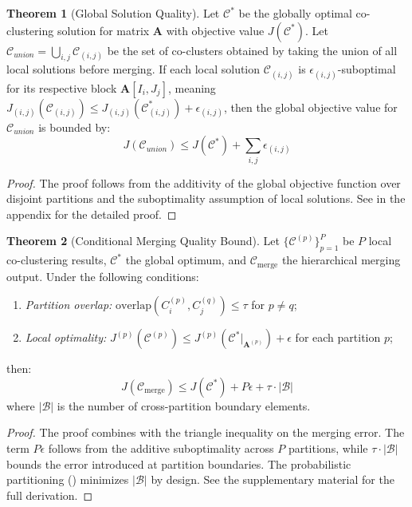 \documentclass[journal]{IEEEtran}
\theoremstyle{definition}
\newtheorem{theorem}{Theorem}
\theoremstyle{remark} %
\begin{document}
{\begin{theorem}[Global Solution Quality]
    \label{thm:global-solution-quality}
    Let $\mathcal{C}^*$ be the globally optimal co-clustering solution for matrix $\mathbf{A}$ with objective value $J(\mathcal{C}^*)$. Let $\mathcal{C}_{union} = \bigcup_{i,j} \mathcal{C}_{(i,j)}$ be the set of co-clusters obtained by taking the union of all local solutions before merging. If each local solution $\mathcal{C}_{(i,j)}$ is $\epsilon_{(i,j)}$-suboptimal for its respective block $\mathbf{A}[I_i, J_j]$, meaning $J_{(i,j)}(\mathcal{C}_{(i,j)}) \le J_{(i,j)}(\mathcal{C}_{(i,j)}^*) + \epsilon_{(i,j)}$, then the global objective value for $\mathcal{C}_{union}$ is bounded by:
    \begin{equation}
        J(\mathcal{C}_{union}) \le J(\mathcal{C}^*) + \sum_{i,j} \epsilon_{(i,j)}
    \end{equation}
\end{theorem}
\begin{proof}
    The proof follows from the additivity of the global objective function over disjoint partitions and the suboptimality assumption of local solutions. See  in the appendix for the detailed proof.
\end{proof}
{\color{blue}
\begin{theorem}[Conditional Merging Quality Bound]\label{thm:merging-quality}
    Let $\{\mathcal{C}^{(p)}\}_{p=1}^{P}$ be $P$ local co-clustering results,
    $\mathcal{C}^*$ the global optimum, and $\mathcal{C}_{\mathrm{merge}}$ the hierarchical
    merging output. Under the following conditions:
    \begin{enumerate}
        \item \emph{Partition overlap:} $\mathrm{overlap}(C_i^{(p)}, C_j^{(q)}) \leq \tau$
              for $p \neq q$;
        \item \emph{Local optimality:} $J^{(p)}(\mathcal{C}^{(p)}) \leq
                  J^{(p)}(\mathcal{C}^*|_{\mathbf{A}^{(p)}}) + \epsilon$ for each partition $p$;
    \end{enumerate}
    then:
    \begin{equation}
        J(\mathcal{C}_{\mathrm{merge}}) \leq J(\mathcal{C}^*) + P\epsilon
        + \tau \cdot |\mathcal{B}|
    \end{equation}
    where $|\mathcal{B}|$ is the number of cross-partition boundary elements.
\end{theorem}
\begin{proof}
    The proof combines  with the triangle inequality on the merging error. The term $P\epsilon$ follows from the additive suboptimality across $P$ partitions, while $\tau \cdot |\mathcal{B}|$ bounds the error introduced at partition boundaries. The probabilistic partitioning () minimizes $|\mathcal{B}|$ by design. See the supplementary material for the full derivation.
\end{proof}

}}
\end{document}
